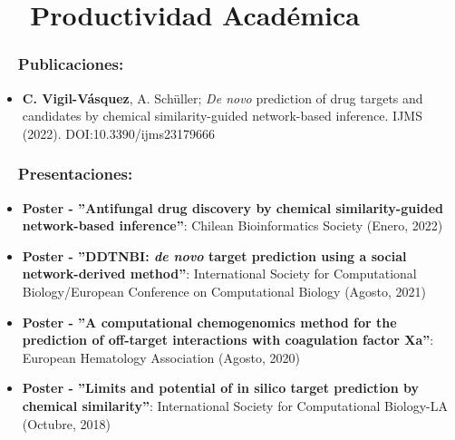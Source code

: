 \documentclass[letter,20pt]{article}
\newcommand{\resumeItem}[2]{
  \item\small{
    \textbf{#1}{: #2 \vspace{-2pt}}
  }
}
\newcommand{\resumeItemWithoutTitle}[1]{
  \item\small{
    {\vspace{-2pt}}
  }
}
\newcommand{\resumeSubItem}[2]{\resumeItem{#1}{#2}\vspace{-3pt}}
\newcommand{\resumeSubHeadingListStart}{\begin{itemize}[leftmargin=*]}
\newcommand{\resumeSubHeadingListEnd}{\end{itemize}}
\begin{document}
\section{~~Productividad Académica}
\subsubsection*{~~Publicaciones:}
\resumeSubHeadingListStart
\vspace{2pt}
\resumeItemWithoutTitle{}{\textbf{C. Vigil-Vásquez}, A. Schüller; \textit{De novo} prediction of drug targets and candidates by chemical similarity-guided network-based inference. IJMS (2022). DOI:10.3390/ijms23179666}
\resumeSubHeadingListEnd


\subsubsection*{~~Presentaciones:}
\resumeSubHeadingListStart
\resumeSubItem{Poster -  ''Antifungal drug discovery by chemical similarity-guided network-based inference''}{Chilean Bioinformatics Society (Enero, 2022)}
\vspace{2pt}
\resumeSubItem{Poster - ''DDTNBI: \textit{de novo} target prediction using a social network-derived method''}{International Society for Computational Biology/European Conference on Computational Biology (Agosto, 2021)}
\vspace{2pt}
\resumeSubItem{Poster - ''A computational chemogenomics method for the prediction of off-target interactions with coagulation factor Xa''}{European Hematology Association (Agosto, 2020)}
\vspace{2pt}
\resumeSubItem{Poster - ''Limits and potential of in silico target prediction by chemical similarity''}{International Society for Computational Biology-LA (Octubre, 2018)}
\resumeSubHeadingListEnd
\vspace{-5pt}
\end{document}
